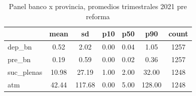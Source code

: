 \begin{table}[htbp]\centering
\def\sym#1{\ifmmode^{#1}\else\(^{#1}\)\fi}
\caption{Panel banco x provincia, promedios trimestrales 2021 pre reforma}
\begin{tabular}{l*{1}{cccccc}}
\toprule
            &        mean&          sd&         p10&         p50&         p90&       count\\
\midrule
dep\_bn      &        0.52&        2.02&        0.00&        0.04&        1.05&        1257\\
pre\_bn      &        0.19&        0.59&        0.00&        0.02&        0.36&        1257\\
suc\_plenas  &       10.98&       27.19&        1.00&        2.00&       32.00&        1248\\
atm         &       42.44&      117.68&        0.00&        5.00&      128.00&        1248\\
\bottomrule
\end{tabular}
\end{table}

